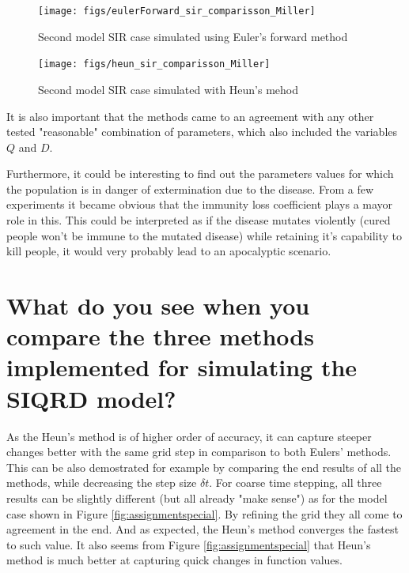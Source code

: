 \documentclass[a4paper]{article}
\begin{document}
\begin{figure}[h]
	\centering
	\begin{minipage}{.5\textwidth}
		\centering
		\texttt{[image: figs/eulerForward\_sir\_comparisson\_Miller]}
		\caption[Forward SIR2]{Second model SIR case simulated using Euler's forward method}
		\label{fig:eulerforwardsircomparissonMiller}
	\end{minipage}%
	\begin{minipage}{.5\textwidth}
		\centering
		\texttt{[image: figs/heun\_sir\_comparisson\_Miller]}
		\caption[Heun SIR2]{Second model SIR case simulated with Heun's mehod}
		\label{fig:heunsircomparissonMiller}
	\end{minipage}
\end{figure}

It is also important that the methods came to an agreement with any other tested "reasonable" combination of parameters, which also included the variables $ Q $ and $ D $.

Furthermore, it could be interesting to find out the parameters values for which the population is in danger of extermination due to the disease. From a few experiments it became obvious that the immunity loss coefficient plays a mayor role in this. This could be interpreted as if the disease mutates violently (cured people won't be immune to the mutated disease) while retaining it's capability to kill people, it would very probably lead to an apocalyptic scenario. 


\section{What do you see when you compare the three methods implemented for simulating the SIQRD model?}

As the Heun's method is of higher order of accuracy, it can capture steeper changes better with the same grid step in comparison to both Eulers' methods. This can be also demostrated for example by comparing the end results of all the methods, while decreasing the step size $ \delta t $. For coarse time stepping, all three results can be slightly different (but all already "make sense") as for the model case shown in Figure \ref{fig:assignmentspecial}. By refining the grid they all come to agreement in the end. And as expected, the Heun's method converges the fastest to such value. It also seems from Figure \ref{fig:assignmentspecial} that Heun's method is much better at capturing quick changes in function values.
\end{document}
